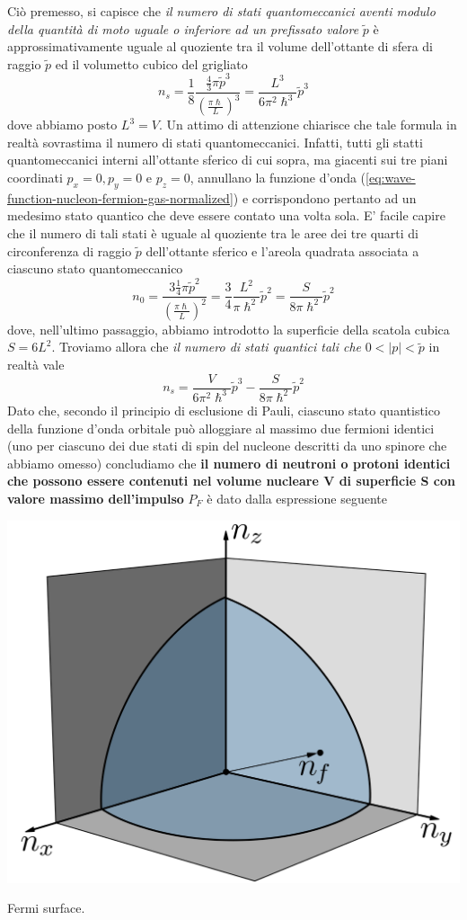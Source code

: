 Ciò premesso, si capisce che \textit{il numero di stati quantomeccanici aventi modulo della quantità di moto uguale o inferiore ad un prefissato valore}
$\tilde{p}$ è approssimativamente uguale al quoziente tra il volume dell’ottante di sfera di raggio $\tilde{p}$ ed il volumetto cubico del grigliato
\[
n_{s} = \frac{1}{8} \frac{ \frac{4}{3} \pi \tilde{p}^{3}}{\left( \frac{\pi \hslash}{L} \right)^{3}} = \frac{L^{3}}{6 \pi^{2}\hslash^{3}}\tilde{p}^{3}
\]
dove abbiamo posto $L^{3} = V$.
Un attimo di attenzione chiarisce che tale formula in realtà sovrastima il numero di stati quantomeccanici.
Infatti, tutti gli statti quantomeccanici interni all’ottante sferico di cui sopra, ma giacenti sui tre piani coordinati $p_x=0, p_y=0$ e $p_z=0$, annullano la funzione d’onda (\ref{eq:wave-function-nucleon-fermion-gas-normalized}) e corrispondono pertanto ad un medesimo stato quantico che deve essere contato una volta sola. E’ facile capire che il numero di tali stati è uguale al quoziente tra le aree dei tre quarti di circonferenza di raggio $\tilde{p}$ dell’ottante sferico e l’areola quadrata associata a ciascuno stato quantomeccanico
\[
n_{0} = \frac{3 \frac{1}{4} \pi \tilde{p}^{2}}{\left( \frac{\pi \hslash}{L} \right)^{2}} = \frac{3}{4} \frac{L^{2}}{\pi \hslash^{2}} \tilde{p}^{2} =
\frac{S}{8\pi \hslash^{2}}\tilde{p}^{2}
\]
dove, nell’ultimo passaggio, abbiamo introdotto la superficie della scatola cubica $S = 6 L^{2}$.
Troviamo allora che \textit{ il numero di stati quantici tali che} $0< | p|<\tilde{p}$  in realtà vale
\[
n_{s} = \frac{V}{6 \pi^{2}\hslash^{3}} \tilde{p}^{3} - \frac{S}{8\pi \hslash^{2}}\tilde{p}^{2}
\]
Dato che, secondo il principio di esclusione di Pauli, ciascuno stato quantistico della funzione d’onda orbitale può alloggiare al massimo due fermioni identici (uno per ciascuno dei due stati di spin del nucleone descritti da uno spinore che abbiamo omesso) concludiamo che \textbf{il numero di neutroni o protoni identici che possono essere contenuti nel volume nucleare V di superficie S con valore massimo dell’impulso} $P_F$ è dato dalla espressione seguente
\begin{marginfigure}
	\includegraphics{figs/Fermi-surface}
	\caption{Fermi surface.}
\end{marginfigure}
